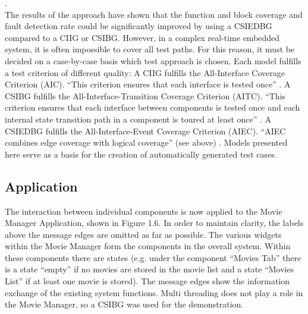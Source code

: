 \cite{Guan2015}.\\
The results of the approach have shown that the function and block
coverage and fault detection rate could be significantly improved
by using a CSIEDBG compared to a CIIG or CSIBG. However, in a complex
real-time embedded system, it is often impossible to cover all test
paths. For this reason, it must be decided on a case-by-case basis
which test approach is chosen. Each model fulfills a test criterion
of different quality: A CIIG fulfills the All-Interface Coverage Criterion
(AIC). ``This criterion ensures that each interface is tested once''
\cite{Guan2015}. A CSIBG fulfills the All-Interface-Transition Coverage
Criterion (AITC). ``This criterion ensures that each interface between
components is tested once and each internal state transition path
in a component is toured at least once'' \cite{Guan2015}. A CSIEDBG
fulfills the All-Interface-Event Coverage Criterion (AIEC). ``AIEC
combines edge coverage with logical coverage'' (see above) \cite{Guan2015}.
Models presented here serve as a basis for the creation of automatically
generated test cases.

\subsection{Application}

The interaction between individual components is now applied to the
Movie Manager Application, shown in Figure 1.6. In order to maintain
clarity, the labels above the message edges are omitted as far as
possible. The various widgets within the Movie Manager form the components
in the overall system. Within these components there are states (e.g.
under the component \enquote{Movies Tab} there is
a state \enquote{empty} if no movies are stored
in the movie list and a state \enquote{Movies List}
if at least one movie is stored). The message edges show the information
exchange of the existing system functions. Multi threading does not
play a role in the Movie Manager, so a CSIBG was used for the demonstration.

